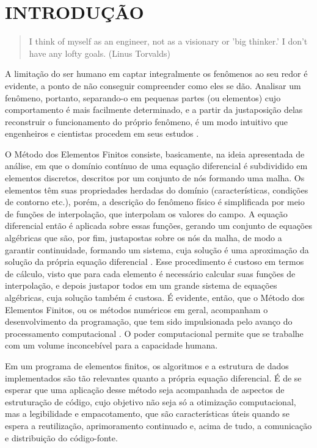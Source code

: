 

\chapter{INTRODUÇÃO}

\begin{quote}
    I think of myself as an engineer, not as a visionary or 'big thinker.' I don't have any lofty goals.
    (Linus Torvalds)  
\end{quote}

A limitação do ser humano em captar integralmente os fenômenos ao seu redor é evidente, a ponto de não conseguir compreender como eles se dão. Analisar um fenômeno, portanto, separando-o em pequenas partes (ou elementos) cujo comportamento é mais facilmente determinado, e a partir da justaposição delas reconstruir o funcionamento do próprio fenômeno, é um modo intuitivo que engenheiros e cientistas procedem em seus estudos \cite[p. 2]{Zin}. 

O Método dos Elementos Finitos consiste, basicamente, na ideia apresentada de análise, em que o domínio contínuo de uma equação diferencial é subdividido em elementos discretos, descritos por um conjunto de nós formando uma malha. Os elementos têm suas propriedades herdadas do domínio (características, condições de contorno etc.), porém, a descrição do fenômeno físico é simplificada por meio de funções de interpolação, que interpolam os valores do campo. A equação diferencial então é aplicada sobre essas funções, gerando um conjunto de equações algébricas que são, por fim, justapostas sobre os nós da malha, de modo a garantir continuidade, formando um sistema, cuja solução é uma aproximação da solução da própria equação diferencial \cite[pág. 1 e 2]{LIU}. Esse procedimento é custoso em termos de cálculo, visto que para cada elemento é necessário calcular suas funções de interpolação, e depois justapor todos em um grande sistema de equações algébricas, cuja solução também é custosa. É evidente, então, que o Método dos Elementos Finitos, ou os métodos numéricos em geral, acompanham o desenvolvimento da programação, que tem sido impulsionada pelo avanço do processamento computacional \cite[pág. 2]{Onate}. O poder computacional permite que se trabalhe com um volume inconcebível para a capacidade humana. 

Em um programa de elementos finitos, os algoritmos e a estrutura de dados implementados são tão relevantes quanto a própria equação diferencial. É de se esperar que uma aplicação desse método seja acompanhada de aspectos de estruturação de código, cujo objetivo não seja só a otimização computacional, mas a legibilidade e empacotamento, que são características úteis quando se espera a reutilização, aprimoramento continuado e, acima de tudo, a comunicação e distribuição do código-fonte.

